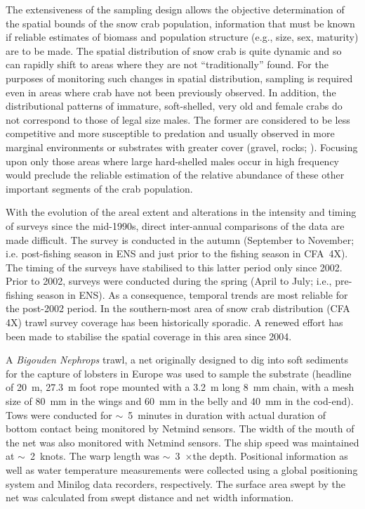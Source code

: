 \documentclass[11pt]{article}
\newcommand{\mult}{$\times$}
\begin{document}
The extensiveness of the sampling design allows the objective determination of the spatial bounds of the snow crab population, information that must be known if reliable estimates of biomass and population structure (e.g., size, sex, maturity) are to be made. The spatial distribution of snow crab is quite dynamic and so can rapidly shift to areas where they are not ``traditionally'' found. For the purposes of monitoring such changes in spatial distribution, sampling is required even in areas where crab have not been previously observed. In addition, the distributional patterns of immature, soft-shelled, very old and female crabs do not correspond to those of legal size males. The former are considered to be less competitive and more susceptible to predation \citep{Hooper1986} and usually observed in more marginal environments or substrates with greater cover (gravel, rocks; \citealt{Comeau1998}). Focusing upon only those areas where large hard-shelled males occur in high frequency would preclude the reliable estimation of the relative abundance of these other important segments of the crab population.

With the evolution of the areal extent and alterations in the intensity and timing of surveys since the mid-1990s, direct inter-annual comparisons of the data are made difficult. The survey is conducted in the autumn (September to November; i.e. post-fishing season in ENS and just prior to the fishing season in CFA~4X). The timing of the surveys have stabilised to this latter period only since 2002. Prior to 2002, surveys were conducted during the spring (April to July; i.e., pre-fishing season in ENS). As a consequence, temporal trends are most reliable for the post-2002 period. In the southern-most area of snow crab distribution (CFA 4X) trawl survey coverage has been historically sporadic. A renewed effort has been made to stabilise the spatial coverage in this area since 2004.

A \textit{Bigouden Nephrops} trawl, a net originally designed to dig into soft sediments for the capture of lobsters in Europe was used to sample the substrate (headline of 20~m, 27.3~m foot rope mounted with a 3.2~m long 8~mm chain, with a mesh size of 80~mm in the wings and 60~mm in the belly and 40~mm in the cod-end). Tows were conducted for $\sim$~5~minutes in duration with actual duration of bottom contact being monitored by Netmind sensors. The width of the mouth of the net was also monitored with Netmind sensors. The ship speed was maintained at $\sim$~2~knots. The warp length was $\sim$~3~\mult the depth. Positional information as well as water temperature measurements were collected using a global positioning system and Minilog data recorders, respectively. The surface area swept by the net was calculated from swept distance and net width information.
\end{document}
